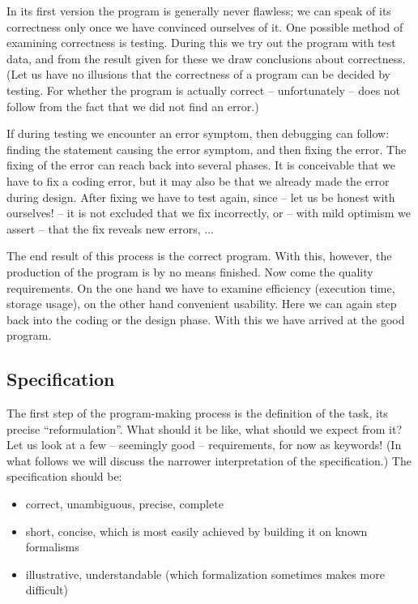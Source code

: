 \documentclass[margin=0px]{article}
\begin{document}
In its first version the program is generally never flawless; we can speak of its correctness only once we have convinced ourselves of it. One possible method of examining correctness is testing. During this we try out the program with test data, and from the result given for these we draw conclusions about correctness. (Let us have no illusions that the correctness of a program can be decided by testing. For whether the program is actually correct -- unfortunately -- does not follow from the fact that we did not find an error.)

If during testing we encounter an error symptom, then debugging can follow: finding the statement causing the error symptom, and then fixing the error. The fixing of the error can reach back into several phases. It is conceivable that we have to fix a coding error, but it may also be that we already made the error during design. After fixing we have to test again, since -- let us be honest with ourselves! -- it is not excluded that we fix incorrectly, or -- with mild optimism we assert -- that the fix reveals new errors, ...

The end result of this process is the correct program. With this, however, the production of the program is by no means finished. Now come the quality requirements. On the one hand we have to examine efficiency (execution time, storage usage), on the other hand convenient usability. Here we can again step back into the coding or the design phase. With this we have arrived at the good program.

\subsection{Specification}
The first step of the program-making process is the definition of the task, its precise ``reformulation''. What should it be like, what should we expect from it? Let us look at a few -- seemingly good -- requirements, for now as keywords! (In what follows we will discuss the narrower interpretation of the specification.) The specification should be:

\begin{itemize}
    \item correct, unambiguous, precise, complete
    \item short, concise, which is most easily achieved by building it on known formalisms
    \item illustrative, understandable (which formalization sometimes makes more difficult)
\end{itemize}
\end{document}
